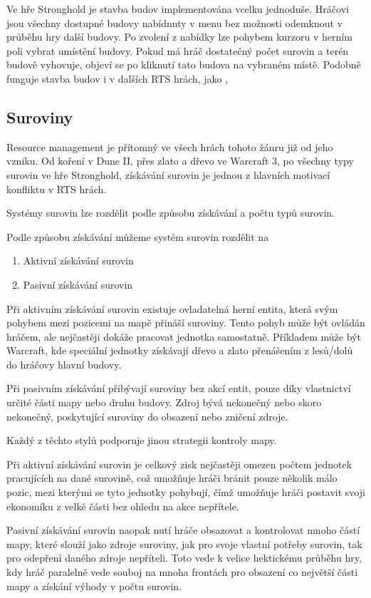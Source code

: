 Ve hře Stronghold je stavba budov implementována vcelku jednoduše. Hráčovi jsou všechny dostupné budovy nabídnuty v menu bez možnosti odemknout v průběhu hry další budovy. Po zvolení z nabídky lze pohybem kurzoru v herním poli vybrat umístění budovy. Pokud má hráč dostatečný počet surovin a terén budově vyhovuje, objeví se po kliknutí tato budova na vybraném místě. Podobně funguje stavba budov i v dalších RTS hrách, jako \cite{Company of Heroes}, \cite{}

\subsection{Suroviny}
Resource management je přítomný ve všech hrách tohoto žánru již od jeho vzniku. Od koření v Dune II, přes zlato a dřevo ve Warcraft 3, po všechny typy surovin ve hře Stronghold, získávání surovin je jednou z hlavních motivací konfliktu v RTS hrách. 

Systémy surovin lze rozdělit podle způsobu získávání a počtu typů surovin.

Podle způsobu získávání můžeme systém surovin rozdělit na
\begin{enumerate}
	\item Aktivní získávání surovin
	\item Pasivní získávání surovin
\end{enumerate}

Při aktivním získávání surovin existuje ovladatelná herní entita, která svým pohybem mezi pozicemi na mapě přináší suroviny. Tento pohyb může být ovládán hráčem, ale nejčastěji dokáže pracovat jednotka samostatně. Příkladem může být Warcraft, kde speciální jednotky získávají dřevo a zlato přenášením z lesů/dolů do hráčovy hlavní budovy.

Při pasivním získávání přibývají suroviny bez akcí entit, pouze díky vlastnictví určité části mapy nebo druhu budovy. Zdroj bývá nekonečný nebo skoro nekonečný, poskytující suroviny do obsazení nebo zničení zdroje.

Každý z těchto stylů podporuje jinou strategii kontroly mapy. 


Při aktivní získávání surovin je celkový zisk nejčastěji omezen počtem jednotek pracujících na dané surovině, což umožňuje hráči bránit pouze několik málo pozic, mezi kterými se tyto jednotky pohybují, čímž umožňuje hráči postavit svoji ekonomiku z velké části bez ohledu na akce nepřítele.

Pasivní získávání surovin naopak nutí hráče obsazovat a kontrolovat mnoho částí mapy, které slouží jako zdroje suroviny, jak pro svoje vlastní potřeby surovin, tak pro odepření daného zdroje nepříteli. Toto vede k velice hektickému průběhu hry, kdy hráč paralelně vede souboj na mnoha frontách pro obsazení co největší části mapy a získání výhody v počtu surovin.

